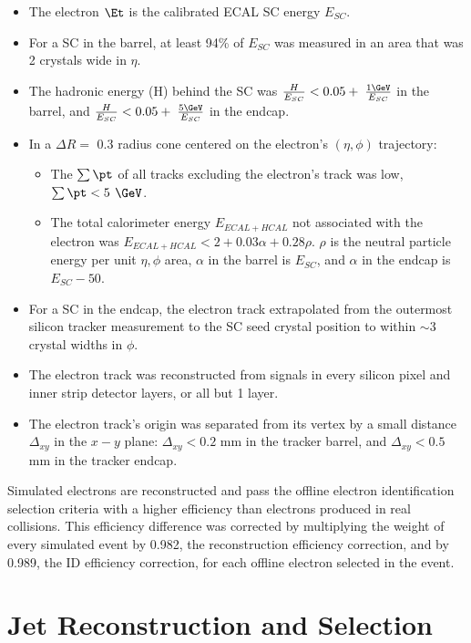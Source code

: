 \begin{itemize}
	\item The electron $\Et$ is the calibrated ECAL SC energy $E_{SC}$.
	\item For a SC in the barrel, at least 94\% of $E_{SC}$ was measured in an area that was 2 crystals wide in $\eta$.
	\item The hadronic energy (H) behind the SC was $\frac{H}{E_{SC}}< 0.05 +\thickspace \frac{1 \GeV}{E_{SC}}$ 
		in the barrel, and $\frac{H}{E_{SC}}< 0.05 +\thickspace \frac{5 \GeV}{E_{SC}}$ in the endcap.
	\item In a $\Delta R =$ 0.3 radius cone centered on the electron's $(\eta, \phi)$ trajectory:
	\begin{itemize}
		\item The $\sum \pt$ of all tracks excluding the electron's track was low, $\sum \pt < 5$ $\GeV$.
		\item The total calorimeter energy $E_{ECAL + HCAL}$ not associated with the electron was 
			$E_{ECAL + HCAL} < 2 + 0.03\alpha + 0.28\rho$.  $\rho$ is the neutral particle energy per unit $\eta,\phi$ area, 
			$\alpha$ in the barrel is $E_{SC}$, and $\alpha$ in the endcap is $E_{SC} - 50$.
	\end{itemize}
	\item For a SC in the endcap, the electron track extrapolated from the outermost silicon tracker measurement to the SC 
		seed crystal position to within $\sim$3 crystal widths in $\phi$.
	\item The electron track was reconstructed from signals in every silicon pixel and inner strip detector layers, or all but 1 layer.
	\item The electron track's origin was separated from its vertex by a small distance $\Delta_{xy}$ in the $x-y$ 
		plane: $\Delta_{xy} < 0.2$ mm in the tracker barrel, and $\Delta_{xy} < 0.5$ mm in the tracker endcap.
\end{itemize}

Simulated electrons are reconstructed and pass the offline electron identification selection criteria with a higher 
efficiency than electrons produced in real collisions.  This efficiency difference was corrected by multiplying the weight of every 
simulated event by 0.982, the reconstruction efficiency correction, and by 0.989, the ID efficiency correction, for each offline 
electron selected in the event.


\section{Jet Reconstruction and Selection}
\label{sec:jetReco}

